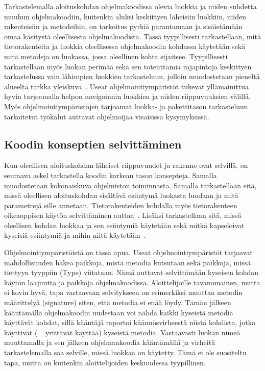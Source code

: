 \documentclass[finnish]{tktltiki2}
\theoremstyle{definition}
\theoremstyle{remark}
\begin{document}
Tarkastelemalla aloituskohdan ohjelmakoodissa olevia luokkia ja niiden suhdetta muuhun ohjelmakoodiin, kuitenkin aluksi keskittyen läheisiin luokkiin, niiden rakenteisiin ja metodeihin, on tarkoitus pyrkiä parantamaan ja sisäistämään omaa käsitystä oleellisesta ohjelmakoodista. Tässä tyypillisesti tarkastellaan, mitä tietorakenteita ja luokkia oleellisessa ohjelmakoodin kohdassa käytetään sekä mitä metodeja on luokassa, jossa oleellinen kohta sijaitsee. Tyypillisesti tarkastellaan myös luokan perimää sekä sen toteuttamia rajapintoja keskittyen tarkastelussa vain lähimpien luokkien tarkasteluun, jolloin muodostetaan pieneltä alueelta tarkka yleiskuva~\cite{questions-during-software-evolution-tasks}.
Useat ohjelmointiympäristöt tukevat yllämainittua hyvin tarjoamalla helpon navigoinnin luokkien ja niiden riippuvuuksien välillä. Myös ohjelmointiympäristöjen tarjoamat luokka- ja pakettitason tarkasteluun tarkoitetut työkalut auttavat ohjelmoijaa visaisissa kysymyksissä.

\subsection{Koodin konseptien selvittäminen}
Kun oleellisen aloituskohdan läheiset riippuvuudet ja rakenne ovat selvillä, on seuraava askel tarkastella koodin korkean tason konsepteja. Samalla muodostetaan kokonaiskuva ohjelmiston toiminnasta. Samalla tarkastellaan sitä, missä oleellisen aloituskohdan sisältävä esiintymä luokasta luodaan ja mitä parametrejä sille annetaan. Tietorakenteiden kohdalla myös tietorakenteen oikeaoppisen käytön selvittäminen auttaa~\cite{eliciting-design-requirements-for-maintenance-oriented-ides}. Lisäksi tarkastellaan sitä, missä oleellisen kohdan luokkaa ja sen esiintymiä käytetään sekä mitkä kapseloivat kyseisiä esiintymiä ja mihin niitä käytetään~\cite{questions-during-software-evolution-tasks}.

Ohjelmointiympäristöistä on tässä apua. Useat ohjelmointiympäristöt tarjoavat mahdollisuuden hakea paikkoja, mistä metodia kutsutaan sekä paikkoja, missä tiettyyn tyyppiin (Type) viitataan. Nämä auttavat selvittämään kyseisen kohdan käytön laajuutta ja paikkoja ohjelmakoodissa. Aloittelijoille tavanomainen, mutta ei kovin hyvä, tapa vastaavaan selvitykseen on esimerkiksi muuttaa metodin määrittelyä (signature) siten, että metodia ei enää löydy. Tämän jälkeen kääntämällä ohjelmakoodin uudestaan voi nähdä kaikki kyseistä metodia käyttävät kohdat, sillä kääntäjä raportoi käännösvirheestä niistä kohdista, jotka käyttivät (= yrittävät käyttää) kyseistä metodia. Vastaavasti luokan nimeä muuttamalla ja sen jälkeen ohjelmankoodia kääntämällä ja virheitä tarkastelemalla saa selville, missä luokkaa on käytetty. Tämä ei ole suositeltu tapa, mutta on kuitenkin aloittelijoiden keskuudessa tyypillinen.
\end{document}
